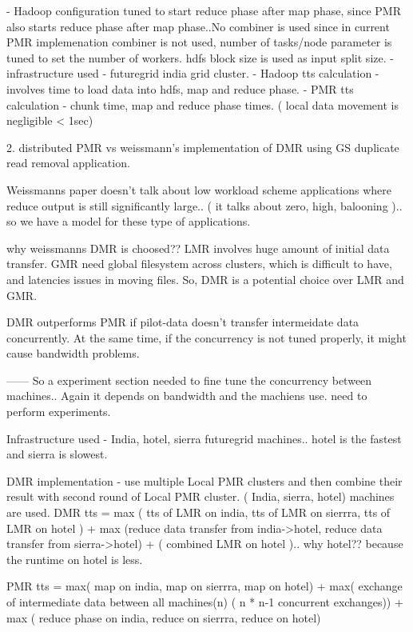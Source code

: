 \documentclass{acm_proc_article-sp}
\begin{document}
     - Hadoop configuration tuned to start reduce phase after map phase, since PMR also starts reduce phase after map phase..No combiner is used since in current PMR implemenation combiner is not used, number of tasks/node parameter is tuned to set the number of workers. hdfs block size is used as input split size. 
     - infrastructure used - futuregrid india grid cluster.
     - Hadoop tts calculation -involves time to load data into hdfs, map and reduce phase.
     - PMR tts calculation - chunk time, map and reduce phase times. ( local data movement is negligible < 1sec)

2. distributed PMR vs weissmann's implementation of  DMR using GS duplicate read removal application.

Weissmanns paper doesn't talk about low workload scheme applications where reduce output is still significantly large.. ( it talks about zero, high, balooning ).. so we have a model for these type of applications.

why weissmanns DMR is choosed?? LMR involves huge amount of initial data transfer. GMR need global filesystem across clusters, which is difficult to have, and latencies issues in moving files. So, DMR is a potential choice over LMR and GMR. 

DMR outperforms PMR if pilot-data doesn't transfer intermeidate data concurrently. At the same time, if the concurrency  is not tuned properly, it might cause bandwidth problems.

------ So a experiment section needed to fine tune the concurrency between machines.. Again it depends on bandwidth and the machiens use. need to perform experiments.

Infrastructure used - India, hotel, sierra futuregrid machines.. hotel is the fastest and sierra is slowest.

DMR implementation - use multiple Local PMR clusters and then combine their result with second round of Local PMR cluster. ( India, sierra, hotel) machines are used.
DMR tts = max ( tts of LMR on india, tts of LMR  on sierrra, tts of LMR  on hotel ) + max (reduce data transfer from india->hotel, reduce data transfer from sierra->hotel) + ( combined LMR on hotel ).. why hotel?? because the runtime on hotel is less.  

PMR tts = max( map  on india, map on  sierrra, map on hotel) + max( exchange of intermediate data between all machines(n) ( n * n-1 concurrent exchanges)) + max ( reduce phase on  india, reduce on  sierrra, reduce on hotel)
\end{document}
